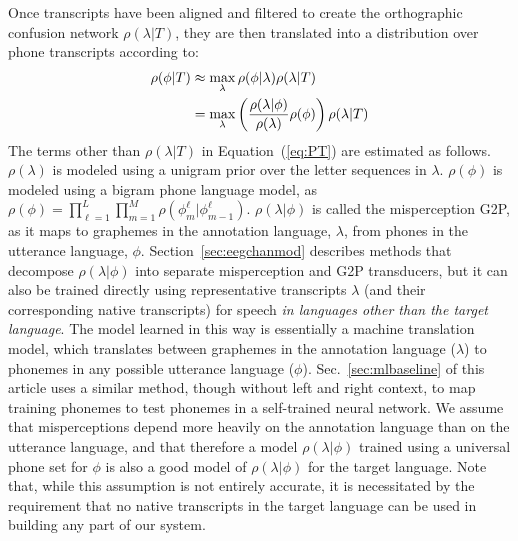Once transcripts have
been aligned and filtered to create the orthographic confusion network
$\rho(\lambda|T)$, they are then translated into a distribution over
phone transcripts according to:
\begin{align}
  \rho(\phi|T) 
  &\approx \max_{\lambda}  \rho(\phi|\lambda) \rho(\lambda|T) \notag \\
  &= \max_{\lambda}  \left(\frac{\rho(\lambda|\phi)}{\rho(\lambda)}
  \rho(\phi)\right) \rho(\lambda|T) 
\label{eq:PT}
\end{align}
The terms other than $\rho(\lambda|T)$ in Equation~(\ref{eq:PT}) are
estimated as follows.  $\rho(\lambda)$ is modeled using a 
unigram prior over the letter sequences in $\lambda$.
$\rho(\phi)$ is modeled using a bigram phone language model,
as $\rho(\phi)=\prod_{\ell=1}^L\prod_{m=1}^M \rho(\phi_m^\ell|\phi_{m-1}^{\ell})$.
$\rho(\lambda|\phi)$ is called the misperception G2P, as it maps to
graphemes in the annotation language, $\lambda$, from phones in the
utterance language, $\phi$.  Section~\ref{sec:eegchanmod} describes
methods that decompose $\rho(\lambda|\phi)$ into separate
misperception and G2P transducers, but it can also be trained directly
using
representative transcripts $\lambda$ (and their
corresponding native transcripts) for speech {\em in languages other
  than the target language}.
{\color{blue} The model learned in this way is essentially
  a machine translation model, which translates between graphemes in
  the annotation language ($\lambda$) to phonemes in any possible
  utterance language ($\phi$).  Sec.~\ref{sec:mlbaseline}
 of this article uses
  a similar method, though without left and right context, to map
  training phonemes to test phonemes in a self-trained neural network.}
We assume that misperceptions depend more
heavily on the annotation language than on the utterance language, and
that therefore a model $\rho(\lambda|\phi)$ trained using a universal
phone set for $\phi$ is also a good model of $\rho(\lambda|\phi)$ for
the target language. Note that, while this assumption is not entirely
accurate, it is necessitated by the requirement that no native
transcripts in the target language can be used in building any part
of our system.

